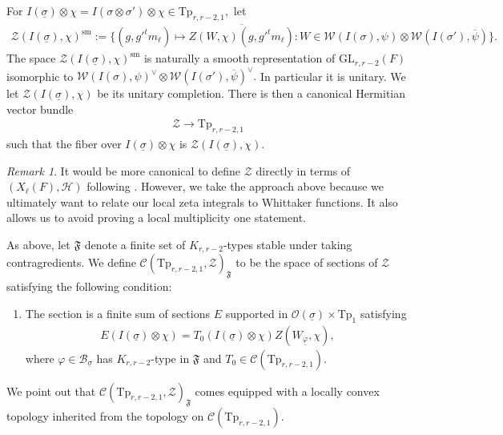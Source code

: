 \documentclass[12pt]{amsart}
\theoremstyle{remark}
\newtheorem*{rem}{Remark}
\numberwithin{equation}{section}
\newcommand{\GL}{\mathrm{GL}}
\newcommand{\lto}{\longrightarrow}
\theoremstyle{definition}
\numberwithin{equation}{subsection}
\begin{document}
For $I(\underline{\sigma}) \otimes \chi=I(\sigma \otimes \sigma') \otimes \chi \in \mathrm{Tp}_{r,r-2,1},$ let
\begin{align} \label{bundle:Z}
    \mathcal{Z}(I(\underline{\sigma}),\chi)^{\mathrm{sm}}:=\bigg\{(g,g'^tm_\ell)\mapsto \overline{Z(W,\chi)(g,g'^tm_\ell)}: W \in \mathcal{W}(I(\sigma),\psi) \widehat{\otimes}\mathcal{W}(I(\sigma'),\overline{\psi}) \bigg\}.
\end{align}
The space $\mathcal{Z}(I(\underline{\sigma}),\chi)^{\mathrm{sm}}$ is naturally a smooth representation of $\GL_{r,r-2}(F)$ isomorphic to $\mathcal{W}(I(\sigma),\psi)^\vee \widehat{\otimes}\mathcal{W}(I(\sigma'),\overline{\psi})^\vee.$  In particular it is unitary.  We let $\mathcal{Z}(I(\underline{\sigma}),\chi)$ be its unitary completion.  There is then a canonical Hermitian vector bundle 
\begin{align}
\mathcal{Z} \lto \mathrm{Tp}_{r,r-2,1}
\end{align}
such that the fiber over $I(\underline{\sigma}) \otimes\chi$ is $\mathcal{Z}(I(\underline{\sigma}), \chi).$

\begin{rem}
It would be more canonical to define $\mathcal{Z}$ directly in terms of $(X_\ell(F),\mathcal{H})$ following \cite{Bernstein:Planch}.  However, we take the approach above because we ultimately want to relate our local zeta integrals to Whittaker functions.  It also allows us to avoid proving a local multiplicity one statement.
\end{rem}



As above, let $\mathfrak{F}$ denote a finite set of $K_{r,r-2}$-types stable under taking contragredients.  We define  $\mathcal{C}(\mathrm{Tp}_{r,r-2,1},\mathcal{Z})_{\mathfrak{F}}$ to be the space of sections of $\mathcal{Z}$ satisfying the following condition:
\begin{enumerate}
\item[] The section is a finite sum of sections $E$ supported in $\mathcal{O}(\underline{\sigma}) \times \mathrm{Tp}_1$ satisfying
\begin{align*}
E(I(\underline{\sigma}) \otimes \chi)= T_0(I(\underline{\sigma}) \otimes \chi)Z(W_{\underline{\varphi}},\chi),
\end{align*}
where $\varphi \in \mathcal{B}_{\underline{\sigma}}$ has $K_{r,r-2}$-type in $\mathfrak{F}$ and $T_0 \in \mathcal{C}(\mathrm{Tp}_{r,r-2,1}).$ 
\end{enumerate}
We point out that $\mathcal{C}(\mathrm{Tp}_{r,r-2,1},\mathcal{Z})_{\mathfrak{F}}$ comes equipped with a locally convex topology inherited from the topology on $\mathcal{C}(\mathrm{Tp}_{r,r-2,1}).$ 
\end{document}
